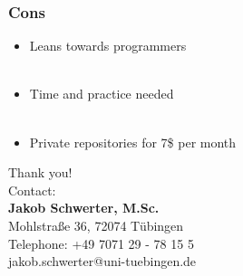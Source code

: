 \documentclass[presentation, 10pt, xcolor=dvipsnames]{beamer}
\begin{document}
\begin{frame}[c]
  \frametitle{Cons}
\begin{itemize}
	\item <1-> Leans towards programmers
	\\~\\ \item <2-> Time and practice needed
	\\~\\ \item <3-> Private repositories for 7\$ per month
	\end{itemize}
\end{frame}

\begin{frame}[c] %
\colorbox{Periwinkle}{\parbox{\textwidth}{\centering\vspace*{1.5cm} \parbox{15cm}{\color{white} {\huge Thank you!}\bigskip \bigskip \\ Contact: \bigskip \\ \textbf{Jakob Schwerter, M.Sc.} \bigskip \\ Mohlstra{\ss}e 36, 72074 T\"ubingen \\ Telephone: +49 7071 29 - 78 15 5\\ jakob.schwerter@uni-tuebingen.de}\vspace*{1.5cm}}}
\end{frame}
\end{document}
